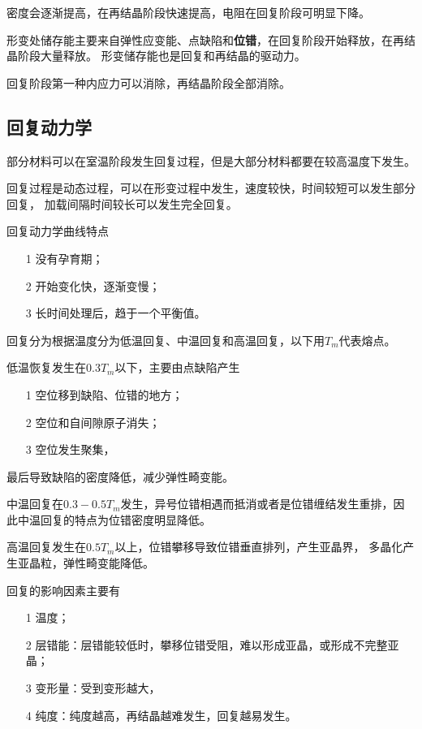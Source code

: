             密度会逐渐提高，在再结晶阶段快速提高，电阻在回复阶段可明显下降。


            形变处储存能主要来自弹性应变能、点缺陷和\textbf{位错}，在回复阶段开始释放，在再结晶阶段大量释放。
            形变储存能也是回复和再结晶的驱动力。

            回复阶段第一种内应力可以消除，再结晶阶段全部消除。

        \subsection{回复动力学}
            部分材料可以在室温阶段发生回复过程，但是大部分材料都要在较高温度下发生。

            回复过程是动态过程，可以在形变过程中发生，速度较快，时间较短可以发生部分回复，
            加载间隔时间较长可以发生完全回复。

            回复动力学曲线特点
            \begin{itemize}
                \item[1] 没有孕育期；
                \item[2] 开始变化快，逐渐变慢；
                \item[3] 长时间处理后，趋于一个平衡值。
            \end{itemize}

            回复分为根据温度分为低温回复、中温回复和高温回复，以下用$T_m$代表熔点。

            低温恢复发生在0.3$T_m$以下，主要由点缺陷产生
            \begin{itemize}
                \item[1] 空位移到缺陷、位错的地方；
                \item[2]  空位和自间隙原子消失；
                \item[3] 空位发生聚集，
            \end{itemize}
            最后导致缺陷的密度降低，减少弹性畸变能。

            中温回复在$0.3-0.5T_m$发生，异号位错相遇而抵消或者是位错缠结发生重排，因此中温回复的特点为位错密度明显降低。

            高温回复发生在$0.5T_m$以上，位错攀移导致位错垂直排列，产生亚晶界，
            多晶化产生亚晶粒，弹性畸变能降低。
        
            回复的影响因素主要有
            \begin{itemize}
                \item[1] 温度；
                \item[2] 层错能：层错能较低时，攀移位错受阻，难以形成亚晶，或形成不完整亚晶；
                \item[3] 变形量：受到变形越大，
                \item[4] 纯度：纯度越高，再结晶越难发生，回复越易发生。
            \end{itemize}

